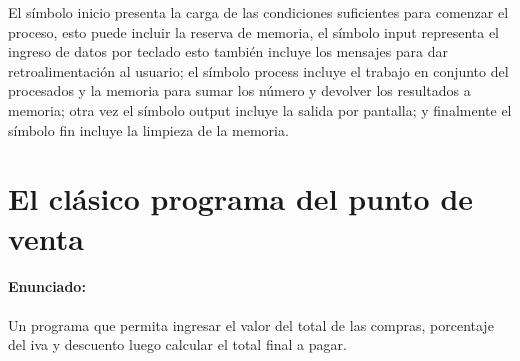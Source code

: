 \documentclass[a4paper,12pt,spanish]{article}
\begin{document}
El símbolo inicio presenta la carga de las condiciones suficientes
para comenzar el proceso, esto puede incluir  la reserva de memoria,
el símbolo input representa  el ingreso  de datos por teclado esto
también incluye los mensajes para dar retroalimentación al usuario; el
símbolo process incluye el trabajo en conjunto del procesados y la
memoria para sumar los número y devolver los resultados a memoria;
otra vez el símbolo output incluye la salida por pantalla; y
finalmente el símbolo fin incluye la limpieza de la memoria.

\newpage
\section{El clásico programa del punto de venta}
\paragraph{Enunciado:}
Un programa que permita ingresar el valor del 
total de las compras, porcentaje del iva y  descuento luego
calcular el total final  a pagar.
\end{document}
